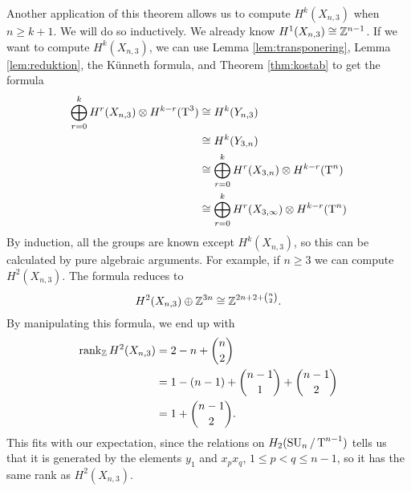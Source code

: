 \begin{example}
  Another application of this theorem allows us to compute
  $H^k(X_{n,3})$ when $n \geq k+1$. We will do so inductively. We
  already know $H^1(X_{n,3}) \cong \mathbb{Z}^{n-1}$. If we want to compute
  $H^k(X_{n,3})$, we can use Lemma \ref{lem:transponering}, Lemma
  \ref{lem:reduktion}, the K\"unneth formula, and Theorem
  \ref{thm:kostab} to get the formula
  \begin{align*}
    \bigoplus_{r=0}^k H^r(X_{n,3}) \otimes H^{k-r}(\operatorname{T}^3) 
    &\cong H^k(Y_{n,3}) \\
    &\cong H^k(Y_{3,n}) \\
    &\cong \bigoplus_{r=0}^k H^r(X_{3,n}) \otimes H^{k-r}(\operatorname{T}^n) \\
    &\cong \bigoplus_{r=0}^k H^r(X_{3,\infty}) \otimes H^{k-r}(\operatorname{T}^n)
  \end{align*}
  By induction, all the groups are known except $H^k(X_{n,3})$, so
  this can be calculated by pure algebraic arguments. For example, if
  $n \geq 3$ we can compute $H^2(X_{n,3})$. The formula reduces to
  \[ H^2(X_{n,3}) \oplus \mathbb{Z}^{3n} \cong \mathbb{Z}^{2n+2+{n\choose 2}}. \]
  By manipulating this formula, we end up with
  \begin{align*}
    \operatorname{rank}_{\mathbb{Z}} H^2(X_{n,3}) &= 2 - n + {n\choose 2} \\
                        &= 1 - (n-1) + {n-1 \choose 1} + {n-1 \choose
                          2} \\
                        &= 1 + {n-1 \choose 2}.
  \end{align*}
  This fits with our expectation, since the relations on
  $H_2(\operatorname{SU}_{n}/\operatorname{T}^{n-1})$
  tells us that it is generated by the elements $y_1$ and $x_p x_q$,
  $1\leq p<q\leq n-1$, so it has the same rank as $H^2(X_{n,3})$.
\end{example}

